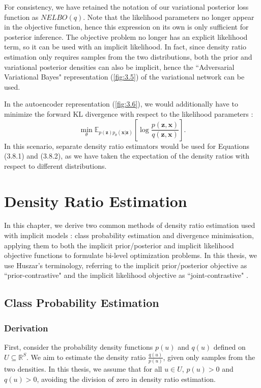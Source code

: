\documentclass[honours,12pt]{unswthesis}
\newcommand{\R}{\mathbb{R}}
\numberwithin{equation}{section}
\theoremstyle{definition}
\begin{document}
For consistency, we have retained the notation of our variational posterior loss function as $NELBO(q)$. Note that the likelihood parameters no longer appear in the objective function, hence this expression on its own is only sufficient for posterior inference. The objective problem no longer has an explicit likelihood term, so it can be used with an implicit likelihood. In fact, since density ratio estimation only requires samples from the two distributions, both the prior and variational posterior densities can also be implicit, hence the ``Adversarial Variational Bayes" representation (\autoref{fig:3.5}) of the variational network can be used.

In the autoencoder representation (\autoref{fig:3.6}), we would additionally have to minimize the forward KL divergence with respect to the likelihood parameters \citep{tiao}:
\begin{equation}
\min_\theta \mathbb{E}_{p(\bm{z})p_\theta(\bm{x}|\bm{z})}\left[\log \frac{p(\bm{z},\bm{x})}{q(\bm{z},\bm{x})}\right].
\end{equation}
In this scenario, separate density ratio estimators would be used for Equations (3.8.1) and (3.8.2), as we have taken the expectation of the density ratios with respect to different distributions.
\chapter{Density Ratio Estimation}\label{ch4}
In this chapter, we derive two common methods of density ratio estimation used with implicit models \citep{sugiyama, mohamed}: class probability estimation and divergence minimisation, applying them to both the implicit prior/posterior and implicit likelihood objective functions to formulate bi-level optimization problems. In this thesis, we use Huszar's terminology, referring to the implicit prior/posterior objective as ``prior-contrastive" and the implicit likelihood objective as ``joint-contrastive" \citep{huszar}.
\section{Class Probability Estimation}\label{sec:4.1}
\subsection{Derivation}\label{sec:4.1.1}
First, consider the probability density functions $p(u)$ and $q(u)$ defined on $U\subseteq \R^S$. We aim to estimate the density ratio $\frac{q(u)}{p(u)}$, given only samples from the two densities. In this thesis, we assume that for all $u\in U$, $p(u)>0$ and $q(u)>0$, avoiding the division of zero in density ratio estimation.
\end{document}
